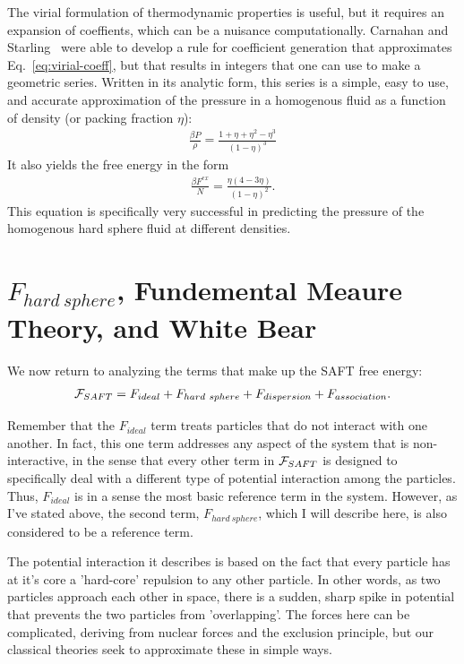 The virial formulation of thermodynamic properties is useful, but it
requires an expansion of coeffients, which can be a nuisance
computationally.  Carnahan and
Starling~\cite{carnahan1969equation,mansoori1971equilibrium} were able
to develop a rule for coefficient generation that approximates
Eq.~\ref{eq:virial-coeff}, but that results in integers that one can
use to make a geometric series.  Written in its analytic form, this
series is a simple, easy to use, and accurate approximation of the
pressure in a homogenous fluid as a function of density (or packing
fraction $\eta$):
\begin{align}
  \frac{\beta P}{\rho}=\frac{1+\eta+\eta^2-\eta^3}{(1-\eta)^3}
\end{align}
It also yields the free energy in the form
\begin{align}
  \frac{\beta F^{ex}}{N}=\frac{\eta(4-3\eta)}{(1-\eta)^2}.
\end{align}
This equation is specifically very successful in predicting the
pressure of the homogenous hard sphere fluid at different densities.



\section{$F_{hard~sphere}$, Fundemental Meaure Theory, and White Bear}

We now return to analyzing the terms that make up the SAFT free energy:
\begin{align}
  \mathcal{F}_{SAFT} = F_{ideal} + F_{hard~sphere} +  F_{dispersion} + F_{association}.
\end{align}

Remember that the $F_{ideal}$ term treats particles that do not
interact with one another.  In fact,
this one term addresses any aspect of the system that is
non-interactive, in the sense that every other term in $\mathcal{F}_{SAFT}$ is
designed to specifically deal with a different type of potential
interaction among the particles.  Thus, $F_{ideal}$ is in a sense the
most basic reference term in the system.  However, as I've stated
above, the second term, $F_{hard~sphere}$, which I will describe here,
is also considered to be a reference term.

The potential interaction it describes is based on the fact that every
particle has at it's core a 'hard-core' repulsion to any other
particle.  In other words, as two particles approach each other in
space, there is a sudden, sharp spike in potential that prevents the
two particles from 'overlapping'.  The forces here can be complicated,
deriving from nuclear forces and the exclusion principle, but our
classical theories seek to approximate these in simple ways.

